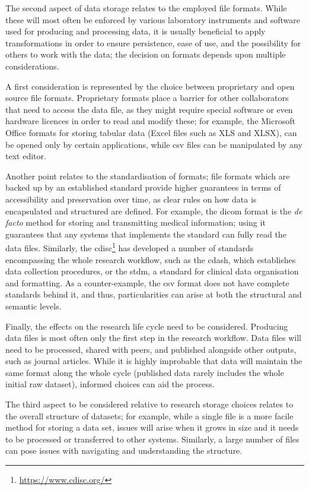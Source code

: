 The second aspect of data storage relates to the employed file formats. While these will most often be enforced by various laboratory instruments and software used for producing and processing data, it is usually beneficial to apply transformations in order to ensure persistence, ease of use, and the possibility for others to work with the data; the decision on formats depends upon multiple considerations.

A first consideration is represented by the choice between proprietary and open source file formats. Proprietary formats place a barrier for other collaborators that need to access the data file, as they might require special software or even hardware licences in order to read and modify these; for example, the Microsoft Office formats for storing tabular data (Excel files such as XLS and XLSX), can be opened only by certain applications, while \gls{csv} files can be manipulated by any text editor.

Another point relates to the standardisation of formats; file formats which are backed up by an established standard provide higher guarantees in terms of accessibility and preservation over time, as clear rules on how data is encapsulated and structured are defined. For example, the \gls{dicom} format is the \emph{de facto} method for storing and transmitting medical information; using it guarantees that any systems that implements the standard can fully read the data files. Similarly, the \gls{cdisc}\footnote{\url{https://www.cdisc.org/}} has developed a number of standards encompassing the whole research workflow, such as the \gls{cdash}, which establishes data collection procedures, or the \gls{stdm}, a standard for clinical data organisation and formatting. As a counter-example, the \gls{csv} format does not have complete standards behind it, and thus, particularities can arise at both the structural and semantic levels.
    
Finally, the effects on the research life cycle need to be considered. Producing data files is most often only the first step in the research workflow. Data files will need to be processed, shared with peers, and published alongside other outputs, such as journal articles. While it is highly improbable that data will maintain the same format along the whole cycle (published data rarely includes the whole initial raw dataset), informed choices can aid the process.

The third aspect to be considered relative to research storage choices relates to the overall structure of datasets; for example, while a single file is a more facile method for storing a data set, issues will arise when it grows in size and it needs to be processed or transferred to other systems. Similarly, a large number of files can pose issues with navigating and understanding the structure.

